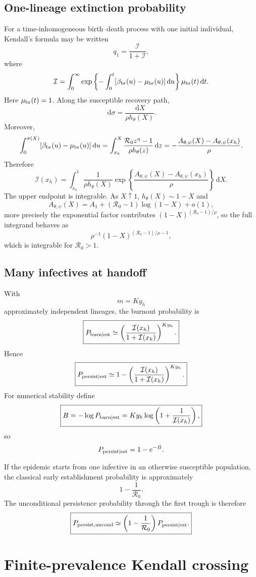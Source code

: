 \documentclass[11pt]{article}
\newcommand{\Rzero}{\mathcal R_0}
\newcommand{\hth}{h_\theta}
\newcommand{\Apsi}{A_{\theta,\psi}}
\newcommand{\dd}{\,\mathrm{d}}
\begin{document}
\subsection{One-lineage extinction probability}
For a time-inhomogeneous birth--death process with one initial individual, Kendall's formula may be written
\[
q_1=\frac{\mathcal I}{1+\mathcal I},
\]
where
\[
\mathcal I
=\int_0^\infty
\exp\left\{-\int_0^t[\beta_{\rm br}(u)-\mu_{\rm br}(u)]\dd u\right\}\mu_{\rm br}(t)\dd t.
\]
Here $\mu_{\rm br}(t)=1$. Along the susceptible recovery path,
\[
\dd\sigma=\frac{\dd X}{\rho\hth(X)}.
\]
Moreover,
\[
\int_{0}^{\sigma(X)}[\beta_{\rm br}(u)-\mu_{\rm br}(u)]\dd u
=\int_{x_h}^{X}
\frac{\Rzero z^\eta-1}{\rho\hth(z)}\dd z
=-\frac{\Apsi(X)-\Apsi(x_h)}\rho.
\]
Therefore
\[
\boxed{
\mathcal I(x_h)
=\int_{x_h}^{1}
\frac1{\rho\hth(X)}
\exp\left\{
\frac{\Apsi(X)-\Apsi(x_h)}\rho
\right\}\dd X.
}
\]
The upper endpoint is integrable. As $X\uparrow1$, $\hth(X)\sim1-X$ and
\[
\Apsi(X)=A_1+(\Rzero-1)\log(1-X)+o(1),
\]
more precisely the exponential factor contributes $(1-X)^{(\Rzero-1)/\rho}$, so the full integrand behaves as
\[
\rho^{-1}(1-X)^{(\Rzero-1)/\rho-1},
\]
which is integrable for $\Rzero>1$.

\subsection{Many infectives at handoff}
With
\[
m=Ky_h
\]
approximately independent lineages, the burnout probability is
\[
\boxed{
P_{\rm burn\mid est}
\simeq
\left(\frac{\mathcal I(x_h)}{1+\mathcal I(x_h)}\right)^{Ky_h}.
}
\]
Hence
\[
\boxed{
P_{\rm persist\mid est}
\simeq
1-
\left(\frac{\mathcal I(x_h)}{1+\mathcal I(x_h)}\right)^{Ky_h}.
}
\]
For numerical stability define
\[
\boxed{
B
=-\log P_{\rm burn\mid est}
=Ky_h\log\left(1+\frac1{\mathcal I(x_h)}\right),
}
\]
so
\[
P_{\rm persist\mid est}=1-e^{-B}.
\]

If the epidemic starts from one infective in an otherwise susceptible population, the classical early establishment probability is approximately
\[
1-\frac1{\Rzero}.
\]
The unconditional persistence probability through the first trough is therefore
\[
\boxed{
P_{\rm persist,uncond}
\simeq
\left(1-\frac1{\Rzero}\right)
P_{\rm persist\mid est}.
}
\]

\section{Finite-prevalence Kendall crossing}
\label{sec:finitekendall}
\end{document}
